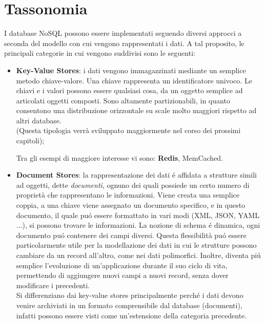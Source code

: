 \section{Tassonomia}
I database NoSQL possono essere implementati seguendo diversi approcci a seconda del modello con cui vengono
rappresentati i dati.
A tal proposito, le principali categorie in cui vengono suddivisi sono le seguenti:
\begin{itemize}
    \item \textbf{Key-Value Stores}: i dati vengono immagazzinati mediante un semplice metodo chiave-valore. Una chiave rappresenta un identificatore
    univoco. Le chiavi e i valori possono essere qualsiasi cosa, da un oggetto semplice ad articolati oggetti composti.
    Sono altamente partizionabili, in quanto consentono una distribuzione orizzontale su scale molto maggiori rispetto ad altri database.\\
    (Questa tipologia verrà sviluppato maggiormente nel corso dei prossimi capitoli);

    Tra gli esempi di maggiore interesse vi sono: \textbf{Redis}, MemCached.
    \item \textbf{Document Stores}: la rappresentazione dei dati é affidata a strutture simili ad oggetti, dette \emph{documenti}, ognuno dei
    quali possiede un certo numero di proprietà che rappresentano le informazioni.
    Viene creata una semplice coppia, a una chiave viene assegnato un documento specifico, e in questo documento, il quale puó essere
    formattato in vari modi (XML, JSON, YAML ...), si possono trovare le informazioni.
    La nozione di schema é dinamica, ogni documento puó contenere dei campi diversi.
    Questa flessibilità puó essere particolarmente
    utile per la modellazione dei dati in cui le strutture possono cambiare da un record all'altro, come nei dati polimorfici.
    Inoltre, diventa piú semplice l'evoluzione di un'applicazione durante il suo ciclo di vita, permettendo di aggiungere
    nuovi campi a nuovi record, senza dover modificare i precedenti.\\
    Si differenziano dai key-value stores principalmente perché i dati devono venire archiviati
    in un formato comprensibile dal database (documenti), infatti possono essere visti come un'estensione
    della categoria precedente.


\end{itemize}
